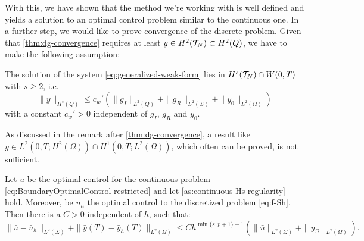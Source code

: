 \documentclass[../thesis.tex]{subfiles}
\begin{document}
With this, we have shown that the method we're working with is well defined and yields a solution to an optimal control problem similar to the continuous one.
In a further step, we would like to prove convergence of the discrete problem.
Given that \cref{thm:dg-convergence} requires at least $y \in H^2(\mathcal{T}_N) \subset H^2(Q)$, we have to make the following assumption:
\begin{assumption}
\label{as:continuous-Hs-regularity}
The solution of the system \cref{eq:generalized-weak-form} lies in $H^s(\mathcal{T}_N) \cap W(0,T)$ with $s \geq 2$, i.e.
\[
	\| y \|_{H^s(Q)} \leq c_w' \left( \| g_I \|_{L^2(Q)} + \| g_R \|_{L^2(\Sigma)} + \| y_0 \|_{L^2(\Omega)} \right)
\]
with a constant $c_w' > 0$ independent of $g_I$, $g_R$ and $y_0$.
\end{assumption}
As discussed in the remark after \cref{thm:dg-convergence}, a result like $y \in L^2(0, T; H^2(\Omega)) \cap H^1(0, T; L^2(\Omega))$, which often can be proved, is not sufficient.
\begin{theorem}
\label{thm:optimal-control-convergence}
Let $\bar{u}$ be the optimal control for the continuous problem \cref{eq:BoundaryOptimalControl-restricted} and let \cref{as:continuous-Hs-regularity} hold. Moreover, be $\bar{u}_h$ the optimal control to the discretized problem \cref{eq:f-Sh}.
Then there is a $C > 0$ independent of $h$, such that:
\[
	\| \bar{u} - \bar{u}_h \|_{L^2(\Sigma)} + \| \bar{y}(T) - \bar{y}_h(T) \|_{L^2(\Omega)} \leq C h^{\min \{ s, p+1\} - 1} \left( \| \bar{u} \|_{L^2(\Sigma)} + \| y_\Omega \|_{L^2(\Omega)} \right).
\]
\end{theorem}
\end{document}
